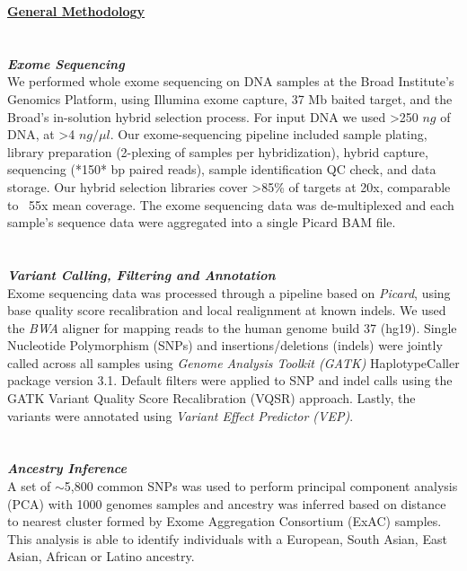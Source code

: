 \newpage

{\Large \textbf{\underline{General Methodology}}}
\\ \\ \\
{\large \textbf{\textit{Exome Sequencing}}}
\\
We performed whole exome sequencing on DNA samples at the Broad Institute's Genomics Platform, using Illumina exome capture, 37 Mb baited target, and the Broad's in-solution hybrid selection process. For input DNA we used \textgreater250 $ng$ of DNA, at \textgreater4 $ng/\mu l$. Our exome-sequencing pipeline included sample plating, library preparation (2-plexing of samples per hybridization), hybrid capture, sequencing (*150* bp paired reads), sample identification QC check, and data storage. Our hybrid selection libraries cover \textgreater85\% of targets at 20x, comparable to ~55x mean coverage. The exome sequencing data was de-multiplexed and each sample's sequence data were aggregated into a single Picard BAM file.
\\ \\ \\
{\large \textbf{\textit{Variant Calling, Filtering and Annotation}}}
\\
Exome sequencing data was processed through a pipeline based on \textit{Picard}, using base quality score recalibration and local 
realignment at known indels. We used the \textit{BWA} aligner for mapping reads to the human genome build 37 (hg19). Single Nucleotide Polymorphism (SNPs) 
and insertions/deletions (indels) were jointly called across all samples using \textit{Genome Analysis Toolkit (GATK)} HaplotypeCaller package version 3.1. 
Default filters were applied to SNP and indel calls using the GATK Variant Quality Score Recalibration (VQSR) approach. 
Lastly, the variants were annotated using \textit{Variant Effect Predictor (VEP)}.
\\ \\ \\
{\large \textbf{\textit{Ancestry Inference}}}
\\
A set of $\sim$5,800 common SNPs was used to perform principal component analysis (PCA) with 1000 genomes samples and ancestry was inferred based on distance to nearest 
cluster formed by Exome Aggregation Consortium (ExAC) samples. This analysis is able to identify individuals with a European, South Asian, East Asian, African or 
Latino ancestry.
\\ \\ \\
